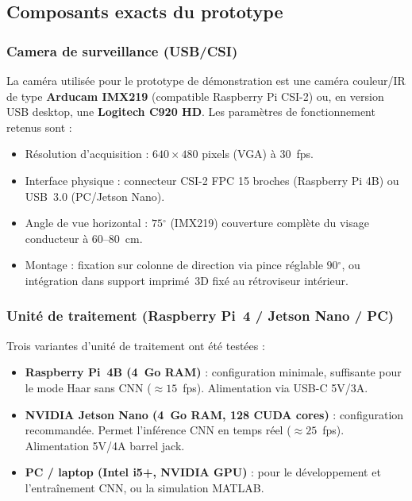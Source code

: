 \documentclass[12pt,a4paper]{report}
\newcommand{\degr}{\ensuremath{^{\circ}}}
\begin{document}
\subsection{Composants exacts du prototype}

\subsubsection{Camera de surveillance (USB/CSI)}

La cam\'era utilis\'ee pour le prototype de d\'emonstration est une cam\'era couleur/IR de type \textbf{Arducam IMX219} (compatible Raspberry Pi CSI-2) ou, en version USB desktop, une \textbf{Logitech C920 HD}. Les param\`etres de fonctionnement retenus sont :
\begin{itemize}
  \item R\'esolution d'acquisition : $640 \times 480$ pixels (VGA) \`a $30$~fps.
  \item Interface physique : connecteur CSI-2 FPC 15 broches (Raspberry Pi 4B) ou USB~3.0 (PC/Jetson Nano).
  \item Angle de vue horizontal : $75\degr$ (IMX219) \textendash{} couverture compl\`ete du visage conducteur \`a $60$--$80$~cm.
  \item Montage : fixation sur colonne de direction via pince r\'eglable $90\degr$, ou int\'egration dans support imprim\'e~3D fix\'e au r\'etroviseur int\'erieur.
\end{itemize}

\subsubsection{Unit\'e de traitement (Raspberry Pi~4 / Jetson Nano / PC)}

Trois variantes d'unit\'e de traitement ont \'et\'e test\'ees :
\begin{itemize}
  \item \textbf{Raspberry Pi~4B (4~Go RAM)} : configuration minimale, suffisante pour le mode Haar sans CNN ($\approx 15$~fps). Alimentation via USB-C 5V/3A.
  \item \textbf{NVIDIA Jetson Nano (4~Go RAM, 128 CUDA cores)} : configuration recommand\'ee. Permet l'inf\'erence CNN en temps r\'eel ($\approx 25$~fps). Alimentation 5V/4A barrel jack.
  \item \textbf{PC / laptop (Intel i5+, NVIDIA GPU)} : pour le d\'eveloppement et l'entra\^inement CNN, ou la simulation MATLAB.
\end{itemize}
\end{document}
